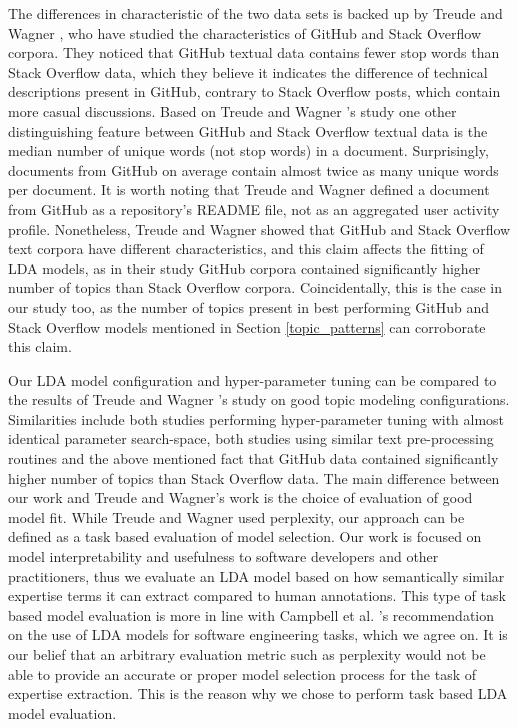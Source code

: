         The differences in characteristic of the two data sets is backed up by Treude and Wagner \cite{treude2019predicting}, who have studied the characteristics of GitHub and Stack Overflow corpora. They noticed that GitHub textual data contains fewer stop words than Stack Overflow data, which they believe it indicates the difference of technical descriptions present in GitHub, contrary to Stack Overflow posts, which contain more casual discussions. Based on Treude and Wagner \cite{treude2019predicting}'s study one other distinguishing feature between GitHub and Stack Overflow textual data is the median number of unique words (not stop words) in a document. Surprisingly, documents from GitHub on average contain almost twice as many unique words per document. It is worth noting that Treude and Wagner defined a document from GitHub as a repository's README file, not as an aggregated user activity profile. Nonetheless, Treude and Wagner showed that GitHub and Stack Overflow text corpora have different characteristics, and this claim affects the fitting of LDA models, as in their study GitHub corpora contained significantly higher number of topics than Stack Overflow corpora. Coincidentally, this is the case in our study too, as the number of topics present in best performing GitHub and Stack Overflow models mentioned in Section \ref{topic_patterns} can corroborate this claim.
    
        Our LDA model configuration and hyper-parameter tuning can be compared to the results of Treude and Wagner \cite{treude2019predicting}'s study on good topic modeling configurations. Similarities include both studies performing hyper-parameter tuning with almost identical parameter search-space, both studies using similar text pre-processing routines and the above mentioned fact that GitHub data contained significantly higher number of topics than Stack Overflow data. The main difference between our work and Treude and Wagner's work is the choice of evaluation of good model fit. While Treude and Wagner used perplexity, our approach can be defined as a task based evaluation of model selection. Our work is focused on model interpretability and usefulness to software developers and other practitioners, thus we evaluate an LDA model based on how semantically similar expertise terms it can extract compared to human annotations. This type of task based model evaluation is more in line with Campbell et al. \cite{campbell2015latent}'s recommendation on the use of LDA models for software engineering tasks, which we agree on. It is our belief that an arbitrary evaluation metric such as perplexity would not be able to provide an accurate or proper model selection process for the task of expertise extraction. This is the reason why we chose to perform task based LDA model evaluation.

